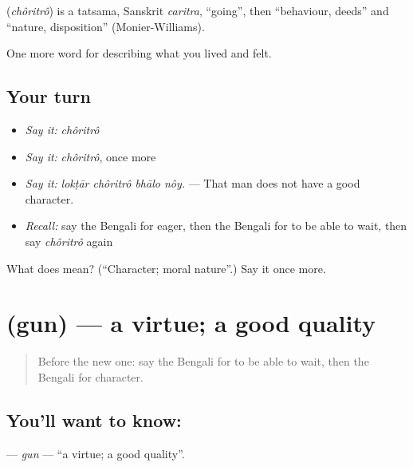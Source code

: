 \begin{cousinweb}
\textbf{} (\emph{chôritrô}) is a tatsama, Sanskrit \emph{caritra}, \textquotedblleft{}going\textquotedblright{}, then \textquotedblleft{}behaviour, deeds\textquotedblright{} and \textquotedblleft{}nature, disposition\textquotedblright{} (Monier-Williams).
\end{cousinweb}

\begin{grammarlens}[title={What you've built}]
One more word for describing what you lived and felt.
\end{grammarlens}

\subsection*{Your turn}
\begin{itemize}
\raggedright
  \item \emph{Say it:} \emph{chôritrô}
  \item \emph{Say it:} \emph{chôritrô}, once more
  \item \emph{Say it:} \emph{lokṭār chôritrô bhālo nôy.} — That man does not have a good character.
  \item \emph{Recall:} say the Bengali for eager, then the Bengali for to be able to wait, then say \emph{chôritrô} again
\end{itemize}

\begin{tcolorbox}[breakable,colback=teal!4,colframe=teal!35!black,title={Before you move on}]
What does  mean? (\textquotedblleft{}Character; moral nature\textquotedblright{}.) Say it once more.
\end{tcolorbox}
\section[\texorpdfstring{\bn{গুণ} (gun)}{গুণ (gun)}]{ (gun) — a virtue; a good quality}

\label{lesson:BN-C456-gun}



\begin{quote}
Before the new one: say the Bengali for to be able to wait, then the Bengali for character.
\end{quote}

\subsection*{You'll want to know: }
\textbf{} — \emph{gun} — \textquotedblleft{}a virtue; a good quality\textquotedblright{}.

